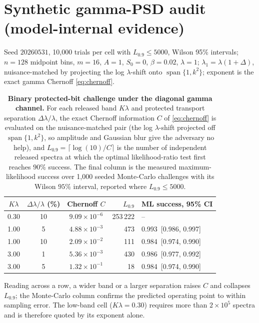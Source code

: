\documentclass[11pt]{article}
\begin{document}
\section{Synthetic gamma-PSD audit (model-internal evidence)}

Seed \(20260531\), 10{,}000 trials per cell with \(L_{0.9}\le5000\), Wilson 95\% intervals; \(n=128\) midpoint bins, \(m=16\), \(A=1\), \(S_0=0\), \(\beta=0.02\), \(\lambda=1\); \(\lambda_1=\lambda(1+\Delta)\), nuisance-matched by projecting the log \(\lambda\)-shift onto \(\operatorname{span}\{1,k^2\}\); exponent is the exact gamma Chernoff \eqref{eq:chernoff}.

\begin{table}[htbp]
\centering
\small
\renewcommand{\arraystretch}{1.15}
\caption{\textbf{Binary protected-bit challenge under the diagonal gamma channel.} For each released band $K\lambda$ and protected transport separation $\Delta\lambda/\lambda$, the exact Chernoff information $C$ of \eqref{eq:chernoff} is evaluated on the nuisance-matched pair (the log $\lambda$-shift projected off $\operatorname{span}\{1,k^2\}$, so amplitude and Gaussian blur give the adversary no help), and $L_{0.9}=\lceil\log(10)/C\rceil$ is the number of independent released spectra at which the optimal likelihood-ratio test first reaches $90\%$ success. The final column is the measured maximum-likelihood success over 1,000 seeded Monte-Carlo challenges with its Wilson $95\%$ interval, reported where $L_{0.9}\le5000$.}
\label{tab:mc-binary}
\setlength{\tabcolsep}{6pt}
\begin{tabular}{c c c r l}
\toprule
{$K\lambda$} & {$\Delta\lambda/\lambda$ (\%)} & {Chernoff $C$} & {$L_{0.9}$} & {ML success, 95\% CI} \\
\midrule
0.30 & 10 & $9.09\times10^{-6}$ & 253\,222 & -- \\
1.00 & 5 & $4.88\times10^{-3}$ & 473 & 0.993~{\footnotesize [0.986, 0.997]} \\
1.00 & 10 & $2.09\times10^{-2}$ & 111 & 0.984~{\footnotesize [0.974, 0.990]} \\
3.00 & 1 & $5.36\times10^{-3}$ & 430 & 0.986~{\footnotesize [0.977, 0.992]} \\
3.00 & 5 & $1.32\times10^{-1}$ & 18 & 0.984~{\footnotesize [0.974, 0.990]} \\
\bottomrule
\end{tabular}
\par\vspace{3pt}
\begin{minipage}{0.92\linewidth}\footnotesize Reading across a row, a wider band or a larger separation raises $C$ and collapses $L_{0.9}$; the Monte-Carlo column confirms the predicted operating point to within sampling error. The low-band cell ($K\lambda=0.30$) requires more than $2\times10^{5}$ spectra and is therefore quoted by its exponent alone.\end{minipage}
\end{table}
\end{document}
